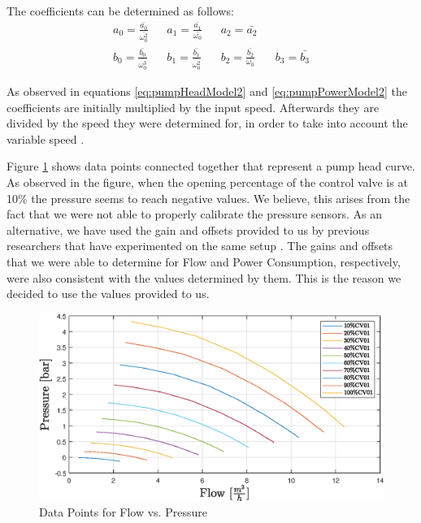 \newpage
The coefficients can be determined as follows:
\begin{align*}
	a_0 = \frac{\bar{a_0}}{\bar{\omega_0^2}} && a_1 = \frac{\bar{a_1}}{\bar{\omega_0}} && a_2 = \bar{a_2} \\
	b_0 = \frac{\bar{b_0}}{\bar{\omega_0^3}} && b_1 = \frac{\bar{b_1}}{\bar{\omega_0^2}} && b_2 = \frac{\bar{b_2}}{\omega_0} && b_3 = \bar{b_3}
\end{align*}
\cite{Yang2010}

As observed in equations \ref{eq:pumpHeadModel2} and \ref{eq:pumpPowerModel2} the coefficients are
initially multiplied by the input speed. Afterwards they are divided by the
speed they were determined for, in order to take into account the variable speed \cite{Yang2010}.

Figure \ref{fig:flowVsPressure} shows data points connected together that represent 
a pump head curve. As observed in the figure, when the opening percentage of the control valve is at
10\% the pressure seems to reach negative values. We believe, this arises from the fact that we were not 
able to properly calibrate the pressure sensors. As an alternative, we have used the gain and offsets
provided to us by previous researchers that have experimented on the same setup \cite{Jepsen2017}.
The gains and offsets that we were able to determine for Flow and Power Consumption,
respectively, were also consistent with the values determined by them.
This is the reason we decided to use the values provided to us.

\begin{figure}[h]
	\centering
	\includegraphics[width=1\textwidth]{figures/05mathematicalModelling/flowVsPressureRun34.eps}
	\caption{Data Points for Flow vs. Pressure}
	\label{fig:flowVsPressure}
\end{figure}

